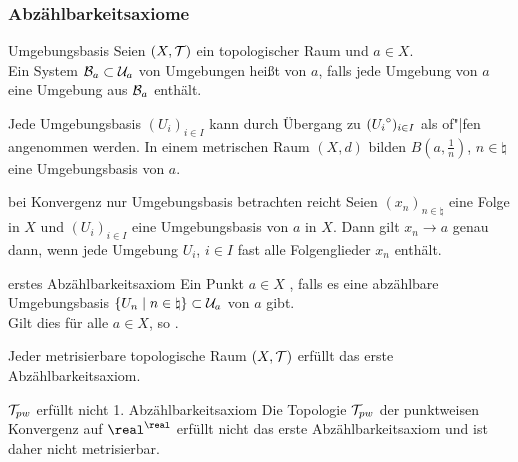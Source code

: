 \pagebreak

\subsubsection{%
    Abzählbarkeitsaxiome%
}

\begin{Def}{Umgebungsbasis}
    Seien $(X, \mathcal{T})$ ein topologischer Raum und $a \in X$. \\
    Ein System $\mathcal{B}_a \subset \mathcal{U}_a$ von Umgebungen heißt
     von $a$, falls jede Umgebung von $a$ eine
    Umgebung aus $\mathcal{B}_a$ enthält.
\end{Def}

\begin{Bsp}
    Jede Umgebungsbasis $(U_i)_{i \in I}$ kann durch Übergang zu
    $({U_i}^\circ)_{i \in I}$ als of"|fen angenommen werden.
    In einem metrischen Raum $(X, d)$ bilden $B\!\left(a, \frac{1}{n}\right)$,
    $n \in \natural$ eine Umgebungsbasis von $a$.
\end{Bsp}

\begin{Lemma}{bei Konvergenz nur Umgebungsbasis betrachten reicht}
    Seien $(x_n)_{n \in \natural}$ eine Folge in $X$ und
    $(U_i)_{i \in I}$ eine Umgebungsbasis von $a$ in $X$.
    Dann gilt $x_n \to a$ genau dann, wenn jede Umgebung $U_i$, $i \in I$
    fast alle Folgenglieder $x_n$ enthält.
\end{Lemma}

\linie

\begin{Def}{erstes Abzählbarkeitsaxiom}
    Ein Punkt $a \in X$ , falls
    es eine abzählbare Umgebungsbasis
    $\{U_n \;|\; n \in \natural\} \subset \mathcal{U}_a$ von $a$ gibt. \\
    Gilt dies für alle $a \in X$, so
    .
\end{Def}

\begin{Bsp}
    Jeder metrisierbare topologische Raum $(X, \mathcal{T})$ erfüllt das erste
    Abzählbarkeitsaxiom.
\end{Bsp}

\begin{Satz}{$\mathcal{T}_{pw}$ erfüllt nicht 1. Abzählbarkeitsaxiom}
    Die Topologie $\mathcal{T}_{pw}$ der punktweisen Konvergenz auf
    $\real^\real$ erfüllt nicht das erste Abzählbarkeitsaxiom und ist daher
    nicht metrisierbar.
\end{Satz}


